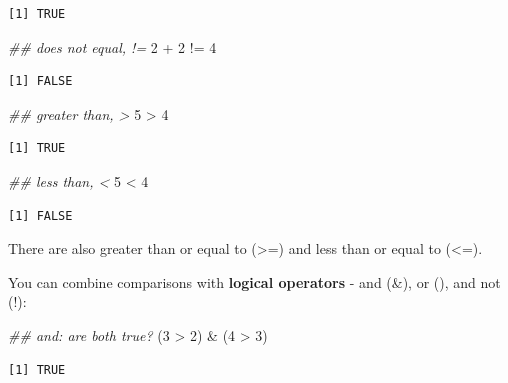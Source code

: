 \documentclass[
  letterpaper,
  DIV=11,
  numbers=noendperiod]{scrreprt}
\newenvironment{Shaded}{\begin{snugshade}}{\end{snugshade}}
\newcommand{\DecValTok}[1]{\textcolor[rgb]{0.68,0.00,0.00}{#1}}
\newcommand{\DocumentationTok}[1]{\textcolor[rgb]{0.37,0.37,0.37}{\textit{#1}}}
\newcommand{\NormalTok}[1]{\textcolor[rgb]{0.00,0.23,0.31}{#1}}
\newcommand{\SpecialCharTok}[1]{\textcolor[rgb]{0.37,0.37,0.37}{#1}}
\begin{document}
\begin{verbatim}
[1] TRUE
\end{verbatim}

\begin{Shaded}
\begin{Highlighting}[]
\DocumentationTok{\#\# does not equal, !=}
\DecValTok{2} \SpecialCharTok{+} \DecValTok{2} \SpecialCharTok{!=} \DecValTok{4}
\end{Highlighting}
\end{Shaded}

\begin{verbatim}
[1] FALSE
\end{verbatim}

\begin{Shaded}
\begin{Highlighting}[]
\DocumentationTok{\#\# greater than, \textgreater{}}
\DecValTok{5} \SpecialCharTok{\textgreater{}} \DecValTok{4}
\end{Highlighting}
\end{Shaded}

\begin{verbatim}
[1] TRUE
\end{verbatim}

\begin{Shaded}
\begin{Highlighting}[]
\DocumentationTok{\#\# less than, \textless{}}
\DecValTok{5} \SpecialCharTok{\textless{}} \DecValTok{4}
\end{Highlighting}
\end{Shaded}

\begin{verbatim}
[1] FALSE
\end{verbatim}

There are also greater than or equal to (\textgreater=) and less than or
equal to (\textless=).

You can combine comparisons with \textbf{logical operators} - and (\&),
or (\textbar), and not (!):

\begin{Shaded}
\begin{Highlighting}[]
\DocumentationTok{\#\# and: are both true?}
\NormalTok{(}\DecValTok{3} \SpecialCharTok{\textgreater{}} \DecValTok{2}\NormalTok{) }\SpecialCharTok{\&}\NormalTok{ (}\DecValTok{4} \SpecialCharTok{\textgreater{}} \DecValTok{3}\NormalTok{) }
\end{Highlighting}
\end{Shaded}

\begin{verbatim}
[1] TRUE
\end{verbatim}
\end{document}
